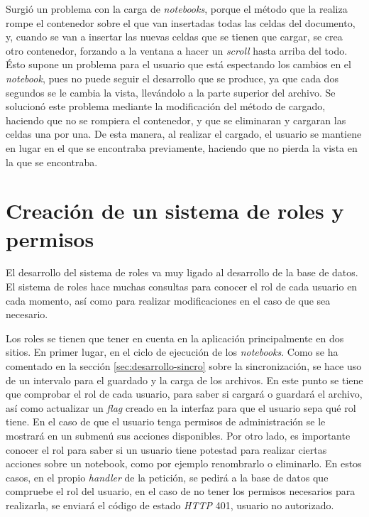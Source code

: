\documentclass[11pt,spanish,listoffigures]{tfgetsinf}
\begin{document}
Surgió un problema con la carga de \textit{notebooks}, porque el método que la realiza rompe el contenedor sobre el que van insertadas todas las celdas del documento, y, cuando se van a insertar las nuevas celdas que se tienen que cargar, se crea otro contenedor, forzando a la ventana a hacer un \textit{\gls{scroll}} hasta arriba del todo. Ésto supone un problema para el usuario que está espectando los cambios en el \textit{notebook}, pues no puede seguir el desarrollo que se produce, ya que cada dos segundos se le cambia la vista, llevándolo a la parte superior del archivo. Se solucionó este problema mediante la modificación del método de cargado, haciendo que no se rompiera el contenedor, y que se eliminaran y cargaran las celdas una por una. De esta manera, al realizar el cargado, el usuario se mantiene en lugar en el que se encontraba previamente, haciendo que no pierda la vista en la que se encontraba.



\section{Creación de un sistema de roles y permisos}
\label{sec:desarrollo-roles}

El desarrollo del sistema de roles va muy ligado al desarrollo de la base de datos. El sistema de roles hace muchas consultas para conocer el rol de cada usuario en cada momento, así como para realizar modificaciones en el caso de que sea necesario. 

Los roles se tienen que tener en cuenta en la aplicación principalmente en dos sitios. En primer lugar, en el ciclo de ejecución de los \textit{notebooks}. Como se ha comentado en la sección \ref{sec:desarrollo-sincro} sobre la sincronización, se hace uso de un intervalo para el guardado y la carga de los archivos. En este punto se tiene que comprobar el rol de cada usuario, para saber si cargará o guardará el archivo, así como actualizar un \textit{\gls{flag}} creado en la interfaz para que el usuario sepa qué rol tiene. En el caso de que el usuario tenga permisos de administración se le mostrará en un submenú sus acciones disponibles. Por otro lado, es importante conocer el rol para saber si un usuario tiene potestad para realizar ciertas acciones sobre un notebook, como por ejemplo renombrarlo o eliminarlo. En estos casos, en el propio \textit{handler} de la petición, se pedirá a la base de datos que compruebe el rol del usuario, en el caso de no tener los permisos necesarios para realizarla, se enviará el código de estado \textit{HTTP} 401, usuario no autorizado. 
\end{document}
